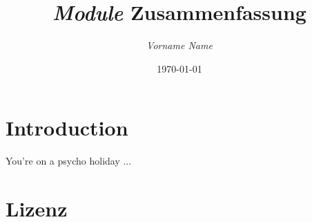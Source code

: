 \documentclass[twoside,a4paper]{article}
\title{\textsl{Module} Zusammenfassung}
\author{\textsl{Vorname Name}}
\date{\today}
\begin{document}
\maketitle
\tableofcontents

\section{Introduction}
You're on a psycho holiday ...

\section{Lizenz}
\doclicenseThis
\end{document}
